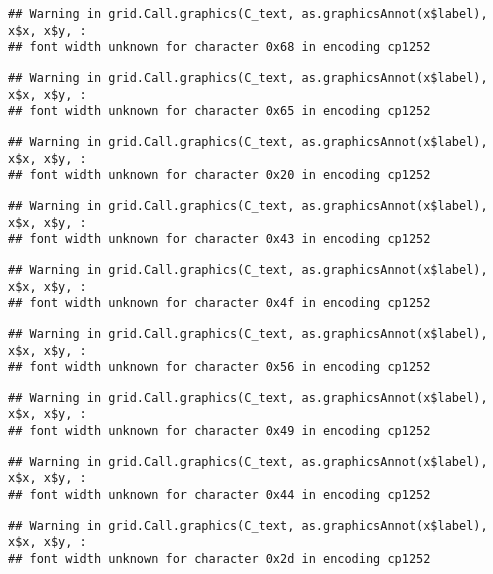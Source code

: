 \documentclass[
]{article}
\begin{document}
\begin{verbatim}
## Warning in grid.Call.graphics(C_text, as.graphicsAnnot(x$label), x$x, x$y, :
## font width unknown for character 0x68 in encoding cp1252
\end{verbatim}

\begin{verbatim}
## Warning in grid.Call.graphics(C_text, as.graphicsAnnot(x$label), x$x, x$y, :
## font width unknown for character 0x65 in encoding cp1252
\end{verbatim}

\begin{verbatim}
## Warning in grid.Call.graphics(C_text, as.graphicsAnnot(x$label), x$x, x$y, :
## font width unknown for character 0x20 in encoding cp1252
\end{verbatim}

\begin{verbatim}
## Warning in grid.Call.graphics(C_text, as.graphicsAnnot(x$label), x$x, x$y, :
## font width unknown for character 0x43 in encoding cp1252
\end{verbatim}

\begin{verbatim}
## Warning in grid.Call.graphics(C_text, as.graphicsAnnot(x$label), x$x, x$y, :
## font width unknown for character 0x4f in encoding cp1252
\end{verbatim}

\begin{verbatim}
## Warning in grid.Call.graphics(C_text, as.graphicsAnnot(x$label), x$x, x$y, :
## font width unknown for character 0x56 in encoding cp1252
\end{verbatim}

\begin{verbatim}
## Warning in grid.Call.graphics(C_text, as.graphicsAnnot(x$label), x$x, x$y, :
## font width unknown for character 0x49 in encoding cp1252
\end{verbatim}

\begin{verbatim}
## Warning in grid.Call.graphics(C_text, as.graphicsAnnot(x$label), x$x, x$y, :
## font width unknown for character 0x44 in encoding cp1252
\end{verbatim}

\begin{verbatim}
## Warning in grid.Call.graphics(C_text, as.graphicsAnnot(x$label), x$x, x$y, :
## font width unknown for character 0x2d in encoding cp1252
\end{verbatim}
\end{document}
